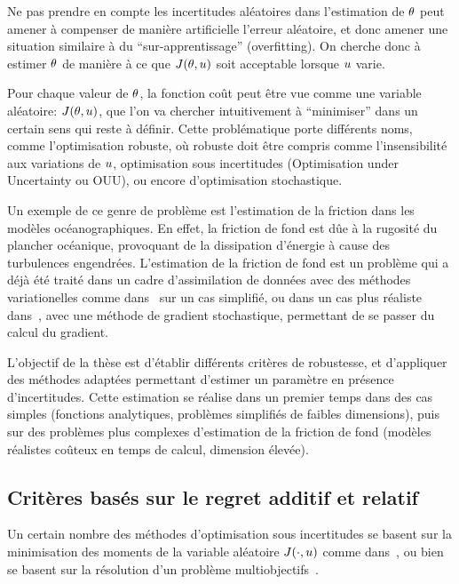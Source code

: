 \documentclass[../../Main_ManuscritThese.tex]{subfiles}
\begin{document}
Ne pas prendre en compte les incertitudes aléatoires dans l'estimation de $\theta$ peut amener à compenser de manière artificielle l'erreur aléatoire, et donc amener une situation similaire à du ``sur-apprentissage'' (overfitting). On cherche donc à estimer $\theta$ de manière à ce que $J(\theta, u)$ soit acceptable lorsque $u$ varie. 


Pour chaque valeur de $\theta$, la fonction coût peut être vue comme une variable aléatoire: $J(\theta,u)$, que l'on va chercher intuitivement à ``minimiser'' dans un certain sens qui reste à définir.
Cette problématique porte différents noms, comme l'optimisation robuste, où robuste doit être compris comme l'insensibilité aux variations de $u$, optimisation sous incertitudes (Optimisation under Uncertainty ou OUU), ou encore d'optimisation stochastique. 

Un exemple de ce genre de problème est l'estimation de la friction dans les modèles océanographiques. En effet, la friction de fond est dûe à la rugosité du plancher océanique, provoquant de la dissipation d'énergie à cause des turbulences engendrées. L'estimation de la friction de fond est un problème qui a déjà été traité dans un cadre d'assimilation de données avec des méthodes variationelles comme dans~\cite{das_estimation_1991,das_variational_1992} sur un cas simplifié, ou dans un cas plus réaliste dans~\cite{boutet_estimation_2015}, avec une méthode de gradient stochastique, permettant de se passer du calcul du gradient.


L'objectif de la thèse est d'établir différents critères de robustesse, et d'appliquer des méthodes adaptées permettant d'estimer un paramètre en présence d'incertitudes. Cette estimation se réalise dans un premier temps dans des cas simples (fonctions analytiques, problèmes simplifiés de faibles dimensions), puis sur des problèmes plus complexes d'estimation de la friction de fond (modèles réalistes coûteux en temps de calcul, dimension élevée).

\subsection*{Critères basés sur le regret additif et relatif}

Un certain nombre des méthodes d'optimisation sous incertitudes se basent sur la minimisation des moments de la variable aléatoire $J(\mathbf{\cdot}, u)$ comme dans~\cite{lehman_designing_2004,janusevskis_simultaneous_2010}, ou bien se basent sur la résolution d'un problème multiobjectifs~\cite{baudoui_optimisation_2012,ribaud_krigeage_2018}.
\end{document}
